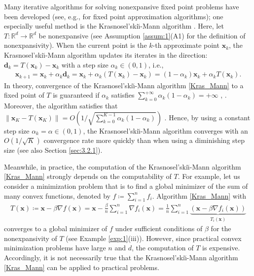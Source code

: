 \documentclass[smallextended,referee,envcountsect,]{svjour3}
\begin{document}
Many iterative algorithms for solving nonexpansive fixed point problems have been developed (see, e.g., \cite{berinde} for fixed point approximation algorithms); one especially useful method is the Krasnosel'ski\u\i-Mann algorithm \cite{kra,mann}. Here, let $T \colon \mathbb{R}^d \to \mathbb{R}^d$ be nonexpansive (see Assumption \ref{assum:1}(A1) for the definition of nonexpansivity). When the current point is the $k$-th approximate point $\bm{x}_k$, the Krasnosel'ski\u\i-Mann algorithm updates its iterates in the direction: $\bm{d}_k = T (\bm{x}_k) - \bm{x}_k$ with a step size $\alpha_k \in (0,1)$, i.e., 
\begin{align}\label{Kras_Mann}
\bm{x}_{k+1} 
= \bm{x}_k + \alpha_k \bm{d}_k
= \bm{x}_k + \alpha_k (T (\bm{x}_k) - \bm{x}_k)
= (1 - \alpha_k) \bm{x}_k + \alpha_k T (\bm{x}_k).
\end{align}
In theory, convergence of the Krasnosel'ski\u\i-Mann algorithm \eqref{Kras_Mann} to a fixed point of $T$ is guaranteed if $\alpha_k$ satisfies $\sum_{k=0}^{+ \infty} \alpha_k (1 - \alpha_k) = + \infty$ \cite[Theorem 5.15]{b-c}, \cite[Corollaries 1-3]{GROETSCH1972369}. Moreover, the algorithm satisfies that $\| \bm{x}_K - T (\bm{x}_K) \| = O(1/\sqrt{\sum_{k=0}^{K-1} \alpha_k (1 - \alpha_k)})$ \cite[Theorem 1]{Cominetti:2014aa}. Hence, by using a constant step size $\alpha_k = \alpha \in (0,1)$, the Krasnosel'ski\u\i-Mann algorithm converges with an $O(1/\sqrt{K})$ convergence rate more quickly than when using a diminishing step size (see also Section \ref{sec:3.2.1}).

Meanwhile, in practice, the computation of the Krasnosel'ski\u\i-Mann algorithm \eqref{Kras_Mann} strongly depends on the computability of $T$. For example, let us consider a minimization problem that is to find a global minimizer of the sum of many convex functions, denoted by $f \coloneqq \sum_{i=1}^n f_i$. Algorithm \eqref{Kras_Mann} with 
\begin{align}\label{many_convex}
T (\bm{x})  
\coloneqq \bm{x} - \beta \nabla f (\bm{x})
= \bm{x} - \frac{\beta}{n} \sum_{i=1}^n \nabla f_i (\bm{x})
= \frac{1}{n} \sum_{i=1}^n \underbrace{\left( \bm{x} - \beta \nabla f_i (\bm{x})   \right)}_{T_i (\bm{x})}
\end{align}
converges to a global minimizer of $f$ under sufficient conditions of $\beta$ for the nonexpansivity of $T$ (see Example \ref{exp:1}(iii)). However, since practical convex minimization problems have large $n$ and $d$, the computation of $T$ is expensive. Accordingly, it is not necessarily true that the Krasnosel'ski\u\i-Mann algorithm \eqref{Kras_Mann} can be applied to practical problems. 
\end{document}
